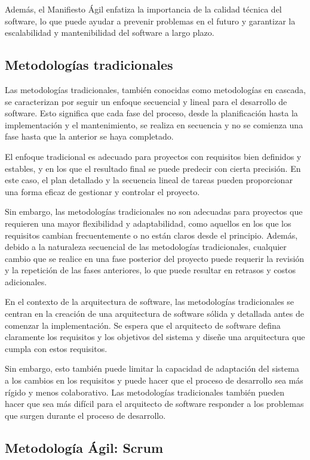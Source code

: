 \documentclass[executivepaper]{article}
\begin{document}
Además, el Manifiesto Ágil enfatiza la importancia de la calidad técnica del software, lo que puede ayudar a prevenir problemas en el futuro y garantizar la escalabilidad y mantenibilidad del software a largo plazo.

\subsection{Metodologías tradicionales}
Las metodologías tradicionales, también conocidas como metodologías en cascada, se caracterizan por seguir un enfoque secuencial y lineal para el desarrollo de software. Esto significa que cada fase del proceso, desde la planificación hasta la implementación y el mantenimiento, se realiza en secuencia y no se comienza una fase hasta que la anterior se haya completado.

El enfoque tradicional es adecuado para proyectos con requisitos bien definidos y estables, y en los que el resultado final se puede predecir con cierta precisión. En este caso, el plan detallado y la secuencia lineal de tareas pueden proporcionar una forma eficaz de gestionar y controlar el proyecto.

Sin embargo, las metodologías tradicionales no son adecuadas para proyectos que requieren una mayor flexibilidad y adaptabilidad, como aquellos en los que los requisitos cambian frecuentemente o no están claros desde el principio. Además, debido a la naturaleza secuencial de las metodologías tradicionales, cualquier cambio que se realice en una fase posterior del proyecto puede requerir la revisión y la repetición de las fases anteriores, lo que puede resultar en retrasos y costos adicionales.

En el contexto de la arquitectura de software, las metodologías tradicionales se centran en la creación de una arquitectura de software sólida y detallada antes de comenzar la implementación. Se espera que el arquitecto de software defina claramente los requisitos y los objetivos del sistema y diseñe una arquitectura que cumpla con estos requisitos.

Sin embargo, esto también puede limitar la capacidad de adaptación del sistema a los cambios en los requisitos y puede hacer que el proceso de desarrollo sea más rígido y menos colaborativo. Las metodologías tradicionales también pueden hacer que sea más difícil para el arquitecto de software responder a los problemas que surgen durante el proceso de desarrollo.

\newpage
\subsection{Metodología Ágil: Scrum}
\end{document}
